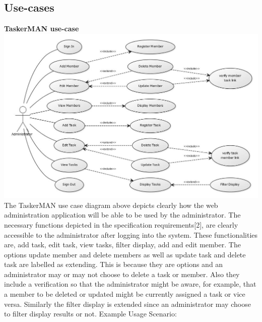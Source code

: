 \documentclass{project}
\begin{document}
\subsection{Use-cases}
\textbf{TaskerMAN use-case} \\
\includegraphics[width=\textwidth]{images/5.1/TaskerMANUseCase}
The TaskerMAN use case diagram above depicts clearly how the web administration application will be able to be used by the administrator.  The necessary functions depicted in the specification requirements[2], are clearly accessible to the administrator after logging into the system. These functionalities are, add task, edit task, view tasks, filter display, add and edit member. The options update member and delete members as well as update task and delete task are labelled as extending.  This is because they are options and an administrator may or may not choose to delete a task or member.  Also they include a verification so that the administrator might be aware, for example, that a member to be deleted or updated might be currently assigned a task or vice versa.  Similarly the filter display is extended since an administrator may choose to filter display results or not.
Example Usage Scenario:
\end{document}
